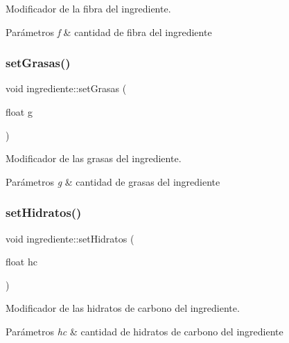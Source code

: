 Modificador de la fibra del ingrediente. 


\begin{DoxyParams}{Parámetros}
{\em f} & cantidad de fibra del ingrediente \\
\hline
\end{DoxyParams}
\mbox{\label{classingrediente_a5b20e7a788dcdb5685c66c7362d65533}} 
\subsubsection{\texorpdfstring{set\+Grasas()}{setGrasas()}}
{\footnotesize\ttfamily void ingrediente\+::set\+Grasas (\begin{DoxyParamCaption}\item[{float}]{g }\end{DoxyParamCaption})}



Modificador de las grasas del ingrediente. 


\begin{DoxyParams}{Parámetros}
{\em g} & cantidad de grasas del ingrediente \\
\hline
\end{DoxyParams}
\mbox{\label{classingrediente_ab678b69e2374ae25439162e4288d1e8a}} 
\subsubsection{\texorpdfstring{set\+Hidratos()}{setHidratos()}}
{\footnotesize\ttfamily void ingrediente\+::set\+Hidratos (\begin{DoxyParamCaption}\item[{float}]{hc }\end{DoxyParamCaption})}



Modificador de las hidratos de carbono del ingrediente. 


\begin{DoxyParams}{Parámetros}
{\em hc} & cantidad de hidratos de carbono del ingrediente \\
\hline
\end{DoxyParams}
\mbox{\label{classingrediente_a72f5ea23629bc29f3b45b7631550319b}} 

